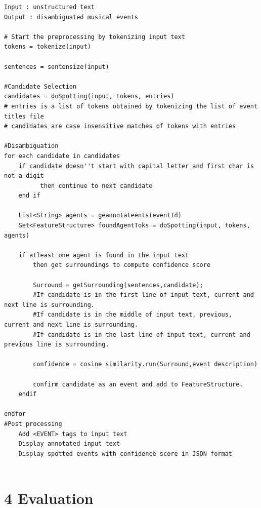 \documentclass[a4paper,11pt]{report}
\begin{document}
\begin{lstlisting}[caption=This listing shows the pseudocode for EventSpotter.]
Input : unstructured text 
Output : disambiguated musical events

# Start the preprocessing by tokenizing input text
tokens = tokenize(input)

sentences = sentensize(input)

#Candidate Selection
candidates = doSpotting(input, tokens, entries)
# entries is a list of tokens obtained by tokenizing the list of event titles file
# candidates are case insensitive matches of tokens with entries

#Disambiguation
for each candidate in candidates
	if candidate doesn''t start with capital letter and first char is not a digit
          then continue to next candidate
	end if

    List<String> agents = geannotateents(eventId)
	Set<FeatureStructure> foundAgentToks = doSpotting(input, tokens, agents)	
	
	if atleast one agent is found in the input text  
		then get surroundings to compute confidence score
			
		Surround = getSurrounding(sentences,candidate);
		#If candidate is in the first line of input text, current and next line is surrounding.
		#If candidate is in the middle of input text, previous, current and next line is surrounding.
		#If candidate is in the last line of input text, current and previous line is surrounding.
	
		confidence = cosine similarity.run(Surround,event description)
	 
		confirm candidate as an event and add to FeatureStructure.
	endif
	
endfor
#Post processing
	Add <EVENT> tags to input text 
	Display annotated input text 
	Display spotted events with confidence score in JSON format
	

\end{lstlisting}


\chapter*{4 Evaluation}
\end{document}

